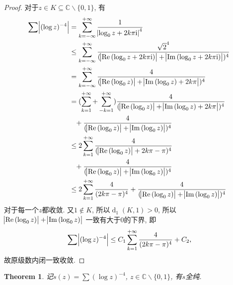 \documentclass[a4paper, 12pt]{ctexart}
\newtheorem{theorem}{Theorem}[section]
\theoremstyle{plain}
\theoremstyle{plain}
\theoremstyle{plain}
\theoremstyle{nonumberplain}
\newtheorem{proof}{Proof}
\DeclareMathOperator*{\diff}{d}
\newcommand{\mi}{\mathrm{i}}
\DeclareMathOperator{\real}{Re}
\DeclareMathOperator{\image}{Im}
\begin{document}
    \begin{proof}
        对于$z\in K \subseteq \mathbb{C}\backslash\{0, 1\}$, 有
        \begin{equation}
        \label{equation_Lemma}
        \begin{aligned}
            \sum{\abs{(\log{z})^{-4}}}
            &= \sum_{k=-\infty}^{+\infty}{
                \frac{1}{\abs{\log_{0}{z}+2k\pi\mi}^{4}}}\\
            &\leq \sum_{k=-\infty}^{+\infty}{
                \frac{\sqrt{2}^{4}}{(\abs{\real{(\log_{0}{z}+2k\pi\mi)}}
                +\abs{\image{(\log_{0}{z}+2k\pi\mi)}})^{4}}}\\
            &= \sum_{k=-\infty}^{+\infty}{
                \frac{4}{(\abs{\real{(\log_{0}{z})}}
                +\abs{\image{(\log_{0}{z})+2k\pi}})^{4}}}\\
            &= (\sum_{k=1}^{+\infty}+\sum_{-k=1}^{+\infty}){
                \frac{4}{(\abs{\real{(\log_{0}{z})}}
                +\abs{\image{(\log_{0}{z})+2k\pi}})^{4}}}\\
                &\phantom{=}+ \frac{4}{(\abs{\real{(\log_{0}{z})}}
                +\abs{\image{(\log_{0}{z})}})^{4}}\\
            &\leq 2\sum_{k=1}^{+\infty}{
                \frac{4}{(\abs{\real{(\log_{0}{z})}}+2k\pi-\pi)^{4}}}\\
                &\phantom{=}+\frac{4}{(\abs{\real{(\log_{0}{z})}}
                +\abs{\image{(\log_{0}{z})}})^{4}}\\
            &\leq 2\sum_{k=1}^{+\infty}{
                \frac{4}{(2k\pi-\pi)^{4}}}
                +\frac{4}{(\abs{\real{(\log_{0}{z})}}
                +\abs{\image{(\log_{0}{z})}})^{4}}
        \end{aligned}
        \end{equation}
        对于每一个$z$都收敛. 又$1\notin K$, 所以$\diff_{1}{(K, 1)}>0$,
        所以$\abs{\real{(\log_{0}{z})}}+\abs{\image{(\log_{0}{z})}}$
        一致有大于0的下界, 即
        \begin{equation}
            \sum{\abs{(\log{z})^{-4}}}
            \leq C_{1}\sum_{k=1}^{+\infty}{\frac{4}{(2k\pi-\pi)^{4}}}
            + C_{2},
        \end{equation}
        故原级数内闭一致收敛.
    \end{proof}

    \begin{theorem}
        记$s(z)=\sum{(\log{z})^{-4}}$, $z\in \mathbb{C}\backslash\{0, 1\}$,
        有$s$全纯.
    \end{theorem}
\end{document}
